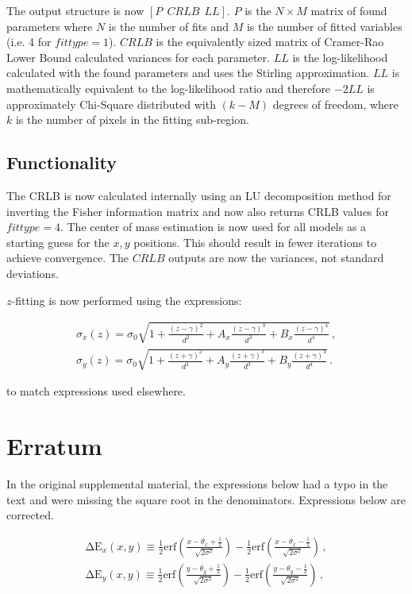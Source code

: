\documentclass[10pt]{article}
\begin{document}
The output structure is now $[P~~CRLB~~LL]$. $P$ is the $N \times M$ matrix of found parameters where $N$ is the number of fits and $M$ is the number of fitted variables (i.e. 4 for $fittype=1$).  $CRLB$ is the equivalently sized matrix of Cramer-Rao Lower Bound calculated variances for each parameter.  $LL$ is the log-likelihood calculated with the found parameters and uses the Stirling approximation.  $LL$ is mathematically equivalent to the log-likelihood ratio and therefore $-2LL$ is approximately Chi-Square distributed with $(k-M)$ degrees of freedom, where $k$ is the number of pixels in the fitting sub-region.

\subsection{Functionality}
The CRLB is now calculated internally using an LU decomposition method for inverting the Fisher information matrix and now also returns CRLB values for $fittype=4$. The center of mass estimation is now used for all models as a starting guess for the $x,y$ positions.  This should result in fewer iterations to achieve convergence.  The $CRLB$ outputs are now the variances, not standard deviations.

$z$-fitting is now performed using the expressions:

\begin{subequations}
\begin{align}
\sigma_x(z)=\sigma_{0}\sqrt{1 + \frac{(z - \gamma)^2}{d^2}+A_x\frac{(z - \gamma)^3}{d^3} + B_x\frac{(z - \gamma)^4}{d^4}}\,,\tag{17a}\\
\sigma_y(z)=\sigma_{0}\sqrt{1 + \frac{(z + \gamma)^2}{d^2}+A_y\frac{(z + \gamma)^3}{d^3} + B_y\frac{(z + \gamma)^4}{d^4}}\,.\tag{17b}
\end{align}
\end{subequations}

to match expressions used elsewhere. 

\section{Erratum}

In the original supplemental material, the expressions below had a typo in the text 
and were missing the square root in the denominators. Expressions below are corrected. 

\begin{subequations}
\begin{align}
\mathrm{\Delta E}_x(x,y)\equiv\frac{1}{2} \mathrm{erf}\left ( \frac{x-\theta_x+\frac{1}{2}}{\sqrt{2\sigma^2}}\right )-\frac{1}{2}\mathrm{erf}\left (\frac{x-\theta_x-\frac{1}{2}}{\sqrt{2\sigma^2}}\right )\,,\tag{4a}\\
\mathrm{\Delta E}_y(x,y)\equiv\frac{1}{2} \mathrm{erf}\left ( \frac{y-\theta_y+\frac{1}{2}}{\sqrt{2\sigma^2}}\right )-\frac{1}{2}\mathrm{erf}\left (\frac{y-\theta_y-\frac{1}{2}}{\sqrt{2\sigma^2}}\right )\,,\tag{4b}
\end{align}
\end{subequations}
\end{document}

